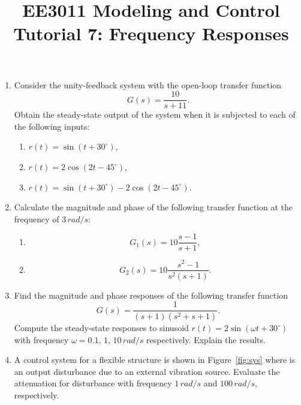\documentclass{article}
\title{EE3011 Modeling and Control\\Tutorial 7: Frequency Responses}
\date{}
\begin{document}
 \maketitle

\begin{enumerate}
\item Consider the unity-feedback system with the open-loop transfer function  
  \[
    G(s) = \frac{10}{s+11}.
  \]
  Obtain the steady-state output of the system when it is subjected to each of the following inputs:
  \begin{enumerate}
  \item  $r(t) = \sin(t+30^\circ)$,
  \item  $r(t) = 2\cos(2t-45^\circ)$,
  \item  $r(t) = \sin(t+30^\circ)-2\cos(2t-45^\circ)$.
  \end{enumerate}

\item Calculate the magnitude and phase of the following transfer function at the frequency of $3\,rad/s$:
  \begin{enumerate}
  \item \[G_1(s) = 10\frac{s-1}{s+1},\]
  \item  \[G_2(s) = 10\frac{s^2-1}{s^2(s+1)}.\]
  \end{enumerate}

\item Find the magnitude and phase responses of the following transfer function
  \[
    G(s) = \frac{1}{(s+1)(s^2+s+1)}.
  \]
  Compute the steady-state responses to sinusoid $r(t) = 2\sin(\omega t+30^\circ)$ with frequency $\omega = 0.1,\,1,\,10\,rad/s$ respectively. Explain the results.

\item A control system for a flexible structure is shown in Figure~\ref{fig:sys} where is an output disturbance due to an external vibration source. Evaluate the attenuation for disturbance with frequency $1\,rad/s$ and $100\,rad/s$, respectively.
  \begin{figure}[ht]
    \centering
{}
\end{figure}
\end{enumerate}
\end{document}
